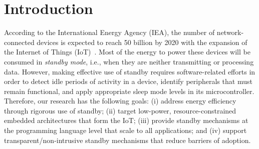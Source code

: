 \vspace{-0.5cm}
\section{Introduction}
\label{sec.introduction}

\begin{comment}
According to the International Energy Agency (IEA), the number of
network-connected devices is expected to reach 50 billion by 2020 with the
expansion of the Internet of Things (IoT)~\cite{iea.data}.
%
However, most of the energy to power these devices will be consumed in
\emph{standby mode}, i.e., when they are neither transmitting or processing
data.
%
For instance, standby power currently accounts for approximately 10--15\% of
residential electricity consumption, and $CO_2$ emissions related to standby
are equivalent to those of 1 million cars~\cite{iea.data,standby.australia}.
%
The projected growth of IoT devices, together with the surprising effects of
standby consumption, made network standby efficiency one of the six
pillars of the \emph{G20's Energy Efficiency Action Plan}%
\footnote{G20's Energy Efficiency Action Plan: \url{https://www.iea-4e.org/projects/g20}}.
%
However, making effective use of standby requires software-related efforts in
order to detect idle periods of activity in a device, identify peripherals
that must remain functional, and apply appropriate sleep mode levels in its
microcontroller.

Given the projected scale of the IoT, the role of low-power standby towards
energy efficiency, and the posed software-related challenges, our research has
the following goals:
\end{comment}
According to the International Energy Agency (IEA), the number of
network-connected devices is expected to reach 50 billion by 2020 with the
expansion of the Internet of Things (IoT)~\cite{iea.data}.
%
Most of the energy to power these devices will be consumed in
\emph{standby mode}, i.e., when they are neither transmitting or processing
data.
%
However, making effective use of standby requires software-related efforts in
order to detect idle periods of activity in a device, identify peripherals
that must remain functional, and apply appropriate sleep mode levels in its
microcontroller.
Therefore, our research has the following goals:
%
(i)   address energy efficiency through rigorous use of standby;
(ii)  target low-power, resource-constrained embedded architectures that form
      the IoT;
(iii) provide standby mechanisms at the programming language level that scale
      to all applications; and
(iv)  support transparent/non-intrusive standby mechanisms that reduce barriers
      of adoption.

